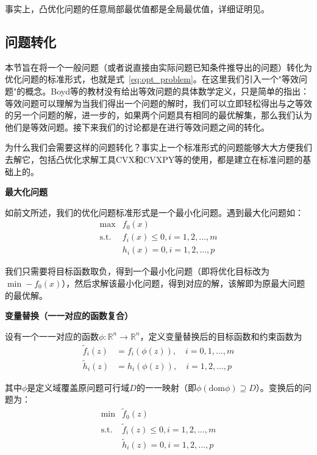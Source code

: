 \documentclass[12pt,a4paper]{book}
\begin{document}
事实上，凸优化问题的任意局部最优值都是全局最优值，详细证明见。

\subsection{问题转化}

本节旨在将一个一般问题（或者说直接由实际问题已知条件推导出的问题）转化为优化问题的标准形式，也就是式~\eqref{eq:opt_problem}。在这里我们引入一个"等效问题"的概念。Boyd等的教材没有给出等效问题的具体数学定义，只是简单的指出：等效问题可以理解为当我们得出一个问题的解时，我们可以立即轻松得出与之等效的另一个问题的解，进一步的，如果两个问题具有相同的最优解集，那么我们认为他们是等效问题。接下来我们的讨论都是在进行等效问题之间的转化。

为什么我们会需要这样的问题转化？事实上一个标准形式的问题能够大大方便我们去解它，包括凸优化求解工具CVX和CVXPY等的使用，都是建立在标准问题的基础上的。

\textbf{最大化问题}

如前文所述，我们的优化问题标准形式是一个最小化问题。遇到最大化问题如：
\begin{equation}
    \begin{aligned}
        \max & f_0(x) \\
        \text{s.t.} & f_i(x)\leq 0 ,i = 1,2,\dots,m\\
        & h_i(x)=0,i = 1,2,\dots,p
    \end{aligned}
\end{equation}

我们只需要将目标函数取负，得到一个最小化问题（即将优化目标改为$\min -f_0(x)$），然后求解该最小化问题，得到对应的解，该解即为原最大问题的最优解。

\textbf{变量替换（一一对应的函数复合）}

设有一个一一对应的函数$\phi:\mathbb{R}^n\to\mathbb{R}^n$，定义变量替换后的目标函数和约束函数为
\begin{align*}
    \tilde{f}_i(z) &= f_i(\phi(z)), \quad i = 0,1,\dots,m \\
    \tilde{h}_i(z) &= h_i(\phi(z)), \quad i = 1,2,\dots,p
\end{align*}

其中$\phi$是定义域覆盖原问题可行域$D$的一一映射（即$\phi(\text{dom} \phi) \supseteq D$）。变换后的问题为：
\begin{equation}
    \begin{aligned}
        \min & \tilde{f}_0(z) \\
        \text{s.t.} & \tilde{f}_i(z) \leq 0 ,i = 1,2,\dots,m\\
        & \tilde{h}_i(z) = 0, i = 1,2,\dots,p
    \end{aligned}
\end{equation}
\end{document}
